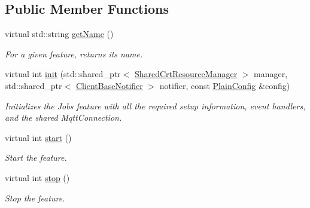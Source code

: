 \subsection*{Public Member Functions}
\begin{DoxyCompactItemize}
\item 
virtual std\+::string \hyperlink{class_aws_1_1_iot_1_1_device_client_1_1_jobs_1_1_jobs_feature_a88bff915e713b132ce5a49a3d60ba294}{get\+Name} ()
\begin{DoxyCompactList}\small\item\em For a given feature, returns its name. \end{DoxyCompactList}\item 
virtual int \hyperlink{class_aws_1_1_iot_1_1_device_client_1_1_jobs_1_1_jobs_feature_ae5ed8ac46280309eb3918b1d19ec1c54}{init} (std\+::shared\+\_\+ptr$<$ \hyperlink{class_aws_1_1_iot_1_1_device_client_1_1_shared_crt_resource_manager}{Shared\+Crt\+Resource\+Manager} $>$ manager, std\+::shared\+\_\+ptr$<$ \hyperlink{class_aws_1_1_iot_1_1_device_client_1_1_client_base_notifier}{Client\+Base\+Notifier} $>$ notifier, const \hyperlink{struct_aws_1_1_iot_1_1_device_client_1_1_plain_config}{Plain\+Config} \&config)
\begin{DoxyCompactList}\small\item\em Initializes the Jobs feature with all the required setup information, event handlers, and the shared Mqtt\+Connection. \end{DoxyCompactList}\item 
virtual int \hyperlink{class_aws_1_1_iot_1_1_device_client_1_1_jobs_1_1_jobs_feature_a6369b1914ce964ca98c9474a38e3214f}{start} ()
\begin{DoxyCompactList}\small\item\em Start the feature. \end{DoxyCompactList}\item 
virtual int \hyperlink{class_aws_1_1_iot_1_1_device_client_1_1_jobs_1_1_jobs_feature_aeec6332d60872b2a4471f6494f93b1c4}{stop} ()
\begin{DoxyCompactList}\small\item\em Stop the feature. \end{DoxyCompactList}\end{DoxyCompactItemize}
